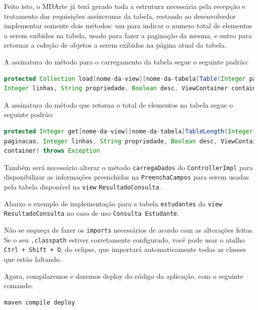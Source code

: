 Feito isto, o MDArte já terá gerado toda a estrutura necessária pela recepção e
tratamento das requisições assíncronas da tabela, restando ao desenvolvedor
implementar somente dois métodos: um para indicar o numero total de elementos a
serem exibidos na tabela, usado para fazer a paginação da mesma, e outro para
retornar a coleção de objetos a serem exibidos na página atual da tabela.

A assinatura do método para o carregamento da tabela segue o seguinte padrão:

\begin{lstlisting}[language=java]
protected Collection load[nome-da-view][nome-da-tabela]Table(Integer paginacao,
Integer linhas, String propriedade, Boolean desc, ViewContainer container) 
\end{lstlisting}

A assinatura do método que retorna o total de elementos na tabela segue o
seguinte padrão:

\begin{lstlisting}[language=java]
protected Integer get[nome-da-view][nome-da-tabela]TableLength(Integer
paginacao, Integer linhas, String propriedade, Boolean desc, ViewContainer
container) throws Exception
\end{lstlisting}

Também será necessário alterar o método \texttt{carregaDados} do
\texttt{ControllerImpl} para disponibilizar as informações preenchidas na
\texttt{PreenchaCampos} para serem usadas pela tabela disponível na
\texttt{view} \texttt{ResultadoConsulta}.

Abaixo o exemplo de implementação para a tabela \texttt{estudantes} da
\texttt{view ResultadoConsulta} no caso de uso \texttt{Consulta Estudante}.

\begin{framed}

\end{framed}

Não se esqueça de fazer os \texttt{imports} necessários de acordo com as
alterações feitas. Se o seu \texttt{.classpath} estiver corretamente
configurado, você pode usar o atalho \texttt{Ctrl + Shift + O}, do eclipse, que
importará automaticamente todas as classes que estão faltando.

Agora, compilaremos e daremos deploy do código da aplicação, com o seguinte
comando:
\begin{lstlisting}[language=bash]
maven compile deploy
\end{lstlisting}

